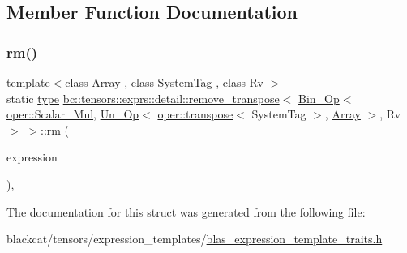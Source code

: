 \subsection{Member Function Documentation}
\mbox{\label{structbc_1_1tensors_1_1exprs_1_1detail_1_1remove__transpose_3_01Bin__Op_3_01oper_1_1Scalar__Mul_6b5c3eb4d56201d2dc306da5aaee0671_a6abb48ea73f3f032d6ca99bc794c558d}} 
\subsubsection{\texorpdfstring{rm()}{rm()}}
{\footnotesize\ttfamily template$<$class Array , class System\+Tag , class Rv $>$ \\
static \hyperlink{structbc_1_1tensors_1_1exprs_1_1detail_1_1remove__transpose_3_01Bin__Op_3_01oper_1_1Scalar__Mul_6b5c3eb4d56201d2dc306da5aaee0671_a6df30413d6a3880290da00eb4995cb09}{type} \hyperlink{structbc_1_1tensors_1_1exprs_1_1detail_1_1remove__transpose}{bc\+::tensors\+::exprs\+::detail\+::remove\+\_\+transpose}$<$ \hyperlink{structbc_1_1tensors_1_1exprs_1_1Bin__Op}{Bin\+\_\+\+Op}$<$ \hyperlink{structbc_1_1oper_1_1Scalar__Mul}{oper\+::\+Scalar\+\_\+\+Mul}, \hyperlink{structbc_1_1tensors_1_1exprs_1_1Un__Op}{Un\+\_\+\+Op}$<$ \hyperlink{structbc_1_1oper_1_1transpose}{oper\+::transpose}$<$ System\+Tag $>$, \hyperlink{structbc_1_1tensors_1_1exprs_1_1Array}{Array} $>$, Rv $>$ $>$\+::rm (\begin{DoxyParamCaption}\item[{\hyperlink{structbc_1_1tensors_1_1exprs_1_1Bin__Op}{Bin\+\_\+\+Op}$<$ \hyperlink{structbc_1_1oper_1_1Scalar__Mul}{oper\+::\+Scalar\+\_\+\+Mul}, \hyperlink{structbc_1_1tensors_1_1exprs_1_1Un__Op}{Un\+\_\+\+Op}$<$ \hyperlink{structbc_1_1oper_1_1transpose}{oper\+::transpose}$<$ System\+Tag $>$, \hyperlink{structbc_1_1tensors_1_1exprs_1_1Array}{Array} $>$, Rv $>$}]{expression }\end{DoxyParamCaption})\hspace{0.3cm}{\ttfamily [inline]}, {\ttfamily [static]}}



The documentation for this struct was generated from the following file\+:\begin{DoxyCompactItemize}
\item 
blackcat/tensors/expression\+\_\+templates/\hyperlink{blas__expression__template__traits_8h}{blas\+\_\+expression\+\_\+template\+\_\+traits.\+h}\end{DoxyCompactItemize}
